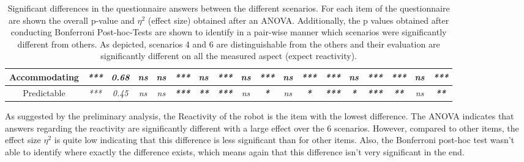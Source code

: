 \begin{sidewaystable}
\begin{tabular}{c|cc|ccccccccccccccc|}
        \multicolumn{1}{|c|}{\textbf{Accommodating}} & \multicolumn{1}{c|}{\textit{***}} & \textit{\textbf{0.68}} & \multicolumn{1}{c|}{\textit{ns}} & \multicolumn{1}{c|}{\textit{ns}} & \multicolumn{1}{c|}{\textit{\textbf{***}}} & \multicolumn{1}{c|}{\textit{ns}}          & \multicolumn{1}{c|}{\textit{\textbf{***}}} & \multicolumn{1}{c|}{\textit{ns}} & \multicolumn{1}{c|}{\textit{\textbf{***}}} & \multicolumn{1}{c|}{\textit{ns}} & \multicolumn{1}{c|}{\textit{\textbf{***}}} & \multicolumn{1}{c|}{\textit{\textbf{***}}} & \multicolumn{1}{c|}{\textit{ns}}         & \multicolumn{1}{c|}{\textit{\textbf{***}}} & \multicolumn{1}{c|}{\textit{\textbf{***}}} & \multicolumn{1}{c|}{\textit{ns}} & \textit{\textbf{***}} \\ \hline
        \multicolumn{1}{|c|}{Predictable}            & \multicolumn{1}{c|}{\textit{***}} & \textit{0.45}          & \multicolumn{1}{c|}{\textit{ns}} & \multicolumn{1}{c|}{\textit{ns}} & \multicolumn{1}{c|}{\textit{\textbf{***}}} & \multicolumn{1}{c|}{\textit{\textbf{**}}} & \multicolumn{1}{c|}{\textit{\textbf{***}}} & \multicolumn{1}{c|}{\textit{ns}} & \multicolumn{1}{c|}{\textit{\textbf{*}}}   & \multicolumn{1}{c|}{\textit{ns}} & \multicolumn{1}{c|}{\textit{\textbf{*}}}   & \multicolumn{1}{c|}{\textit{\textbf{***}}} & \multicolumn{1}{c|}{\textit{\textbf{*}}} & \multicolumn{1}{c|}{\textit{\textbf{***}}} & \multicolumn{1}{c|}{\textit{\textbf{**}}}  & \multicolumn{1}{c|}{\textit{ns}} & \textit{\textbf{**}}  \\ \hline
        \end{tabular}
        \caption{Significant differences in the questionnaire answers between the different scenarios. For each item of the questionnaire are shown the overall p-value and $\eta^2$ (effect size) obtained after an ANOVA. Additionally, the p values obtained after conducting Bonferroni Post-hoc-Tests are shown to identify in a pair-wise manner which scenarios were significantly different from others. As depicted, scenarios 4 and 6 are distinguishable from the others and their evaluation are significantly different on all the measured aspect (expect reactivity).}
        \label{tab:questionnaire_answers}
\end{sidewaystable}

As suggested by the preliminary analysis, the Reactivity of the robot is the item with the lowest difference. The ANOVA indicates that answers regarding the reactivity are significantly different with a large effect over the 6 scenarios. However, compared to other items, the effect size $\eta^2$ is quite low indicating that this difference is less significant than for other items. Also, the Bonferroni post-hoc test wasn't able to identify where exactly the difference exists, which means again that this difference isn't very significant in the end. 

